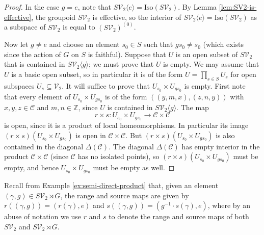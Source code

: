 \documentclass[10pt,a4paper]{amsart}
\numberwithin{equation}{section}
\numberwithin{figure}{section}
\theoremstyle{definition}
\newcommand{\cC}{\mathcal{C}}
\newcommand{\cV}{\mathcal{V}}
\newcommand{\bZ}{\mathbb{Z}}
\begin{document}
\begin{proof}
In the case $g=e$, note that $S\cV_2 \langle e \rangle = \mathrm{Iso}(S\cV_2)$. By Lemma \ref{lem:SV2-is-effective}, the groupoid $S\cV_2$ is effective, so the interior of $S\cV_2 \langle e \rangle = \mathrm{Iso}(S\cV_2)$ as a subspace of $S\cV_2$ is equal to $(S\cV_2)^{(0)}$.

Now let $g \neq e$ and choose an element $s_0 \in S$ such that $gs_0 \neq s_0$ (which exists since the action of $G$ on $S$ is faithful). Suppose that $U$ is an open subset of $S\cV_2$ that is contained in $S\cV_2 \langle g \rangle$; we must prove that $U$ is empty. We may assume that $U$ is a basic open subset, so in particular it is of the form $U = \prod_{s \in S} U_s$ for open subspaces $U_s \subseteq \cV_2$. It will suffice to prove that $U_{s_0} \times U_{gs_0}$ is empty. First note that every element of $U_{s_0} \times U_{gs_0}$ is of the form $((y,m,x),(z,n,y))$ with $x,y,z \in \cC$ and $m,n \in \bZ$, since $U$ is contained in $S\cV_2 \langle g \rangle$. The map
\[
r \times s \colon U_{s_0} \times U_{gs_0} \longrightarrow \cC \times \cC
\]
is open, since it is a product of local homeomorphisms. In particular its image $(r \times s)(U_{s_0} \times U_{gs_0})$ is open in $\cC \times \cC$. But $(r \times s)(U_{s_0} \times U_{gs_0})$ is also contained in the diagonal $\Delta(\cC)$. The diagonal $\Delta(\cC)$ has empty interior in the product $\cC \times \cC$ (since $\cC$ has no isolated points), so $(r \times s)(U_{s_0} \times U_{gs_0})$ must be empty, and hence $U_{s_0} \times U_{gs_0}$ must be empty as well.
\end{proof}

Recall from Example \ref{ex:semi-direct-product} that, given an element $(\gamma,g) \in S\mathcal{V}_2\rtimes {G}$, the range and source maps are given by $r((\gamma,g)) = (r(\gamma),e)$ and $s((\gamma,g)) = (g^{-1} \cdot s(\gamma),e)$, where by an abuse of notation we use $r$ and $s$ to denote the range and source maps of both $S\cV_2$ and $S\cV_2 \rtimes G$.
\end{document}
